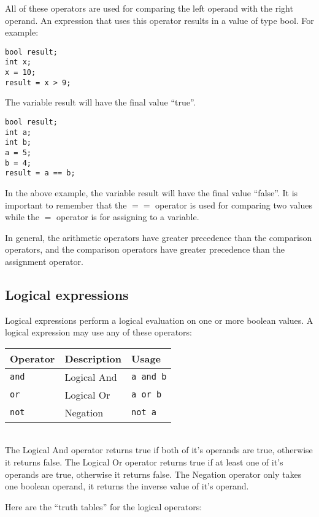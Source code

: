 \documentclass[a4paper,12pt]{article}
\begin{document}
All of these operators are used for comparing the left operand with the right operand. An expression that uses this operator results in a value of type bool. For example:

\begin{lstlisting}
bool result;
int x;
x = 10;
result = x > 9;
\end{lstlisting}

The variable result will have the final value ``true''. 

\begin{lstlisting}
bool result;
int a;
int b;
a = 5;
b = 4;
result = a == b;
\end{lstlisting}

In the above example, the variable result will have the final value ``false''. It is important to remember that the $==$ operator is used for comparing two values while the $=$ operator is for assigning to a variable.

In general, the arithmetic operators have greater precedence than the comparison operators, and the comparison operators have greater precedence than the assignment operator.

\subsection*{Logical expressions}

Logical expressions perform a logical evaluation on one or more boolean values. A logical expression may use any of these operators: \\

\begin{tabular}{|l|l|l|}
\hline
Operator & Description & Usage \\
\hline
\texttt{and} & Logical And & \texttt{a and b} \\
\hline
\texttt{or} & Logical Or & \texttt{a or b} \\
\hline
\texttt{not} & Negation & \texttt{not a} \\
\hline
\end{tabular} \\

The Logical And operator returns true if both of it's operands are true, otherwise it returns false. The Logical Or operator returns true if at least one of it's operands are true, otherwise it returns false. The Negation operator only takes one boolean operand, it returns the inverse value of it's operand. 

Here are the ``truth tables'' for the logical operators: \\
\end{document}
